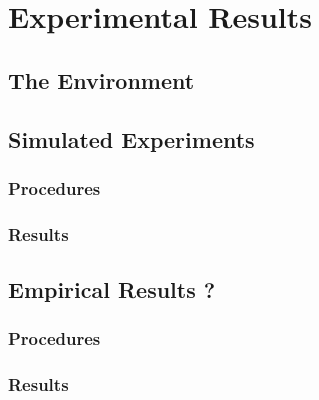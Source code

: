 \chapter{Experimental Results}
\label{chapter3}


\section{The Environment}
\label{sec:chapter3:environment}

\section{Simulated Experiments}
\label{sec:chapter3:simulation}

\subsection{Procedures}
\label{subsec:chapter3:simulation:procedures}

\subsection{Results}
\label{subsec:chapter3:simulation:results}

\section{Empirical Results ?}
\label{sec:chapter3:empirical}

\subsection{Procedures}
\label{subsec:chapter3:empirical:procedures}

\subsection{Results}
\label{subsec:chapter3:empirical:results}